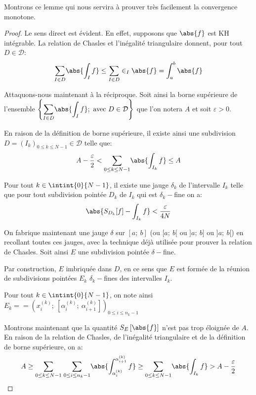 Montrons ce lemme qui nous servira à prouver très facilement la convergence monotone.

\begin{proof}
Le sens direct est évident. En effet, supposons que $\abs{f}$ est KH intégrable. La relation de Chasles et l'inégalité triangulaire donnent, pour tout $D \in \mathcal{D}$:
\[
\displaystyle{\sum \limits_{I \in D}} \abs{\int_I f} \leq \displaystyle{\sum \limits_{I \in D}} \in_I \abs{f} = \int_a^b \abs{f}
\]

Attaquons-nous maintenant à la réciproque. Soit ainsi la borne supérieure de l'ensemble $\left \{ \displaystyle{\sum \limits_{I \in D}} \abs{\int_I f}; \text{ avec }D  \in \mathcal{D}\right \}$ que l'on notera $A$ et soit $\varepsilon>0$.

En raison de la définition de borne supérieure, il existe ainsi une subdivision $D=(I_k)_{0 \leq k \leq N-1} \in \mathcal{D}$ telle que:
\[
A-\dfrac{\varepsilon}{2}<\displaystyle{\sum \limits_{0 \leq k \leq N-1}} \abs{\int_{I_k} f} \leq A
\]

Pour tout $k \in \intint{0}{N-1}$, il existe une jauge $\delta_k$ de l'intervalle $I_k$ telle que pour tout subdivision pointée $D_k$ de $I_k$ qui est $\delta_k-$fine on a:
\[
\abs{S_{D_k}[f]-\int_{I_k}f} < \dfrac{\varepsilon}{4N}
\]


On fabrique maintenant une jauge $\delta$ sur $[a;~b]$ (ou $[a;~b[$ ou $]a;~b]$ ou $]a;~b[$) en recollant toutes ces jauges, avec la technique déjà utilisée pour prouver la relation de Chasles. Soit ainsi $E$ une subdivision pointée $\delta-$fine.

Par construction, $E$ \og imbriquée \fg{} dans $D$, en ce sens que $E$ est formée de la réunion de subdivisions pointées $E_k$ $\delta_k-$fines des intervalles $I_k$. 

Pour tout $k \in \intint{0}{N-1}$, on note ainsi $E_k =  = \left (x_i^{(k)};~[\alpha_i^{(k)};~\alpha_{i+1}^{(k)}]\right )_{0 \leq i \leq n_k-1}$


Montrons maintenant que la quantité $S_E\left [\abs{f}\right ]$ n'est pas trop éloignée de $A$. En raison de la relation de Chasles, de l'inégalité triangulaire et de la définition de borne supérieure, on a:
\begin{equation}
\label{borne_sup}
A \geq 
\displaystyle{\sum \limits_{0 \leq k \leq N-1}} \; \displaystyle{\sum \limits_{0 \leq i \leq n_k-1}} \abs{\int_{\alpha_i^{(k)}}^{\alpha_{i+1}^{(k)}} f} \geq \displaystyle{\sum \limits_{0 \leq k \leq N-1}} \abs{\int_{I_k} f} >
A - \dfrac{\varepsilon}{2}
\end{equation}




\end{proof}
